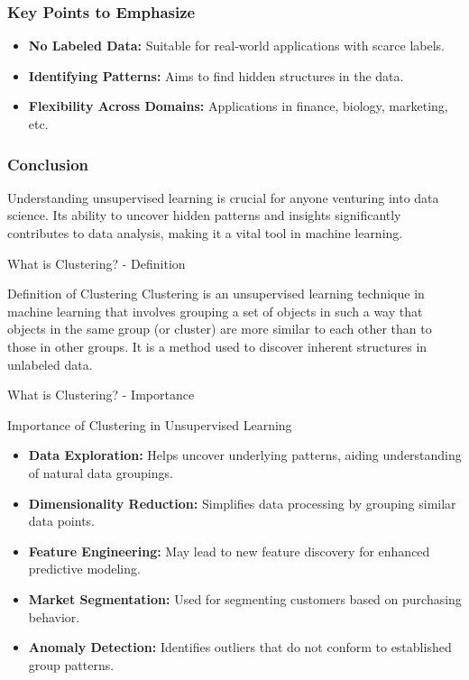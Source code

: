 \documentclass[aspectratio=169]{beamer}
\begin{document}
\begin{frame}[fragile]
    \frametitle{Key Points to Emphasize}
    \begin{itemize}
        \item \textbf{No Labeled Data:} Suitable for real-world applications with scarce labels.
        \item \textbf{Identifying Patterns:} Aims to find hidden structures in the data.
        \item \textbf{Flexibility Across Domains:} Applications in finance, biology, marketing, etc.
    \end{itemize}
\end{frame}

\begin{frame}[fragile]
    \frametitle{Conclusion}
    Understanding unsupervised learning is crucial for anyone venturing into data science. Its ability to uncover hidden patterns and insights significantly contributes to data analysis, making it a vital tool in machine learning.
\end{frame}

\begin{frame}[fragile]{What is Clustering? - Definition}
    \begin{block}{Definition of Clustering}
        Clustering is an unsupervised learning technique in machine learning that involves grouping a set of objects in such a way that objects in the same group (or cluster) are more similar to each other than to those in other groups. It is a method used to discover inherent structures in unlabeled data.
    \end{block}
\end{frame}

\begin{frame}[fragile]{What is Clustering? - Importance}
    \begin{block}{Importance of Clustering in Unsupervised Learning}
        \begin{itemize}
            \item \textbf{Data Exploration:} Helps uncover underlying patterns, aiding understanding of natural data groupings.
            \item \textbf{Dimensionality Reduction:} Simplifies data processing by grouping similar data points.
            \item \textbf{Feature Engineering:} May lead to new feature discovery for enhanced predictive modeling.
            \item \textbf{Market Segmentation:} Used for segmenting customers based on purchasing behavior.
            \item \textbf{Anomaly Detection:} Identifies outliers that do not conform to established group patterns.
        \end{itemize}
    \end{block}
\end{frame}
\end{document}
